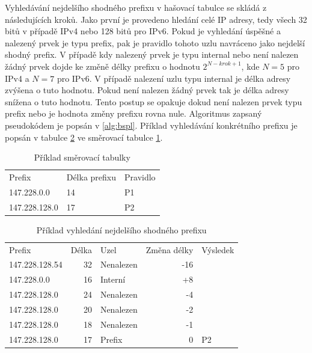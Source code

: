 Vyhledávání nejdelšího shodného prefixu v hašovací tabulce se skládá z následujících kroků.
Jako první je provedeno hledání celé IP adresy, tedy všech 32 bitů v případě IPv4 nebo 128 bitů pro IPv6.
Pokud je vyhledání úspěšné a nalezený prvek je typu prefix, pak je pravidlo tohoto uzlu navráceno
jako nejdelší shodný prefix. V případě kdy nalezený prvek je typu internal nebo není nalezen žádný prvek dojde ke změně délky prefixu o hodnotu $2^{N - krok + 1}$, kde $N = 5$ pro IPv4 a $N = 7$ pro IPv6.
V případě nalezení uzlu typu internal je délka adresy zvýšena o tuto hodnotu.
Pokud není nalezen žádný prvek tak je délka adresy snížena o tuto hodnotu.
Tento postup se opakuje dokud není nalezen prvek typu prefix nebo je hodnota změny prefixu rovna nule.
Algoritmus zapsaný pseudokódem je popsán v \ref{alg:bspl}.
Příklad vyhledávání konkrétního prefixu je popsán v tabulce \ref{tab:bspl-example} ve směrovací tabulce \ref{tab:bspl-table-example}.

\begin{table}[!htbp]
	\center
    \begin{tabular}{|l|l|l|}
    \hline
    Prefix        & Délka prefixu & Pravidlo \\ \hhline{|=|=|=|}
    147.228.0.0   & 14            & P1       \\ \hline
    147.228.128.0 & 17            & P2       \\ \hline
    \end{tabular}
    \label{tab:bspl-table-example}
    \caption{Příklad směrovací tabulky}
\end{table}

\begin{table}[!htbp]
	\center
    \begin{tabular}{|l|r|l|r|l|}
    \hline
    Prefix & Délka & Uzel & Změna délky & Výsledek \\ \hhline{|=|=|=|=|=|}
    147.228.128.54 & 32 & Nenalezen & -16 &  \\ \hline
    147.228.0.0 & 16 & Interní & +8 &  \\ \hline
    147.228.128.0 & 24 & Nenalezen & -4 &  \\ \hline
    147.228.128.0 & 20 & Nenalezen & -2 &  \\ \hline
    147.228.128.0 & 18 & Nenalezen & -1 &  \\ \hline
    147.228.128.0 & 17 & Prefix & 0 & P2 \\ \hline
    \end{tabular}
    \label{tab:bspl-example}
    \caption{Příklad vyhledání nejdelšího shodného prefixu}
\end{table}

